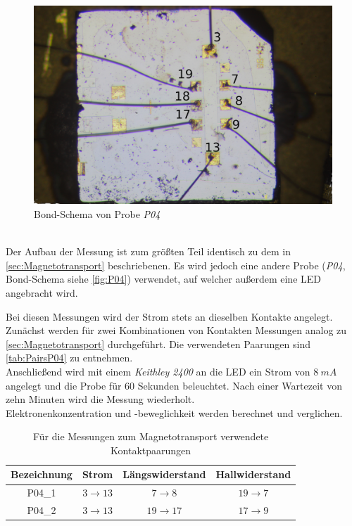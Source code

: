 \begin{figure}
\includegraphics[scale=0.05]{Pictures/P04BondSchema}
\caption{Bond-Schema von Probe \emph{P04}}
\label{fig:P04}
\end{figure}
\hfill\\
Der Aufbau der Messung ist zum größten Teil identisch zu dem in \autoref{sec:Magnetotransport} beschriebenen. Es wird jedoch eine andere Probe (\emph{P04}, Bond-Schema siehe \autoref{fig:P04}) verwendet, auf welcher außerdem eine LED angebracht wird.

Bei diesen Messungen wird der Strom stets an dieselben Kontakte angelegt.
Zunächst werden für zwei Kombinationen von Kontakten Messungen analog zu \autoref{sec:Magnetotransport} durchgeführt. Die verwendeten Paarungen sind \autoref{tab:PairsP04} zu entnehmen.\\
Anschließend wird mit einem \emph{Keithley 2400} an die LED ein Strom von $8\ \si{mA}$ angelegt und die Probe für $60$ Sekunden beleuchtet.
Nach einer Wartezeit von zehn Minuten wird die Messung wiederholt.\\
Elektronenkonzentration und -beweglichkeit werden berechnet und verglichen.

\begin{table}[ht]
\caption{Für die Messungen zum Magnetotransport verwendete Kontaktpaarungen}
\label{tab:PairsP04}
\centering
\begin{tabular}{cccc}
\toprule
Bezeichnung & Strom & Längswiderstand & Hallwiderstand\\
\midrule
P04\_1 & $3\rightarrow 13$ & $7\rightarrow 8$ & $19\rightarrow 7$\\
P04\_2 & $3\rightarrow 13$ & $19\rightarrow 17$ & $17\rightarrow 9$\\
\bottomrule
\end{tabular}
\end{table}
